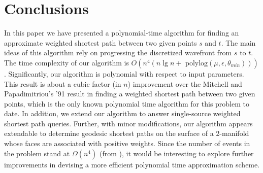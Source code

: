 \documentclass[11pt]{article}
\begin{document}
\section{Conclusions}
\label{sect:conclu}

In this paper we have presented a polynomial-time algorithm for finding an approximate weighted shortest path between two given points $s$ and $t$.
The main ideas of this algorithm rely on progressing the discretized wavefront from $s$ to $t$. 
The time complexity of our algorithm is $O(n^4(n \lg{n} + \text{ polylog}(\mu, \epsilon, \theta_{min})))$.
Significantly, our algorithm is polynomial with respect to input parameters.
This result is about a cubic factor (in $n$) improvement over the Mitchell and Papadimitriou's '91 result \cite{journals/jacm/MitchellP91} in finding a weighted shortest path between two given points, which is the only known polynomial time algorithm for this problem to date.
In addition, we extend our algorithm to answer single-source weighted shortest path queries.
Further, with minor modifications, our algorithm appears extendable to determine geodesic shortest paths on the surface of a $2$-manifold whose faces are associated with positive weights. 
Since the number of events in the problem stand at $\Omega(n^4)$ (from \cite{journals/jacm/MitchellP91}), it would be interesting to explore further improvements in devising a more efficient polynomial time approximation scheme.




\end{document}

